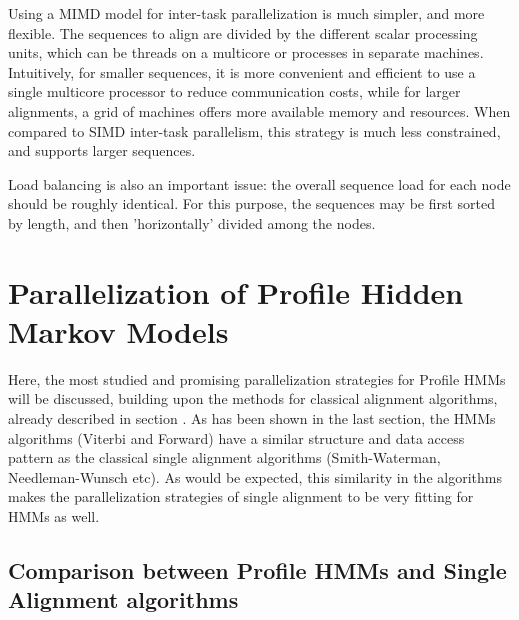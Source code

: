 Using a MIMD model for inter-task parallelization is much simpler, and more flexible. The sequences to align are divided by the different scalar processing units, which can be threads on a multicore or processes in separate machines. Intuitively, for smaller sequences, it is more convenient and efficient to use a single multicore processor to reduce communication costs, while for larger alignments, a grid of machines offers more available memory and resources. When compared to SIMD inter-task parallelism, this strategy is much less constrained, and supports larger sequences.

Load balancing is also an important issue: the overall sequence load for each node should be roughly identical. For this purpose, the sequences may be first sorted by length, and then 'horizontally' divided among the nodes.








\section{Parallelization of Profile Hidden Markov Models}

Here, the most studied and promising parallelization strategies for Profile HMMs will be discussed, building upon the methods for classical alignment algorithms, already described in section . As has been shown in the last section, the HMMs algorithms (Viterbi and Forward) have a similar structure and data access pattern as the classical single alignment algorithms (Smith-Waterman, Needleman-Wunsch etc). As would be expected, this similarity in the algorithms makes the parallelization strategies of single alignment to be very fitting for HMMs as well.


\subsection{Comparison between Profile HMMs and Single Alignment algorithms}

